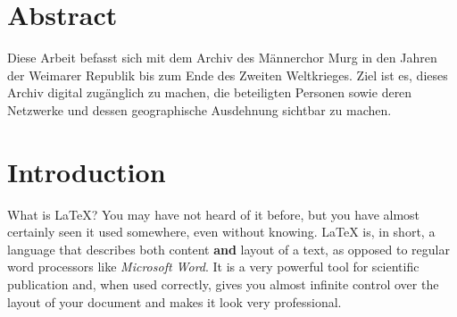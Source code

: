 \documentclass[12pt, a4paper, ngerman, bidi=default]{article}
\renewcommand*\contentsname{Inhaltsverzeichnis}
\newcommand\contentsname{Inhaltsverzeichnis}
\begin{document}
\pagecolor{white}  
\color{black}  %
\section*{Abstract}

Diese Arbeit befasst sich mit dem Archiv des Männerchor Murg in den Jahren der Weimarer Republik bis zum Ende des Zweiten Weltkrieges. Ziel ist es, dieses Archiv digital zugänglich zu machen, die beteiligten Personen sowie deren Netzwerke und dessen geographische Ausdehnung sichtbar zu machen.








\renewcommand*\contentsname{Table of Contents} %
{
\hypersetup{linkcolor=}
\setcounter{tocdepth}{5} %
\tableofcontents
}
\newpage
{} %



\section{Introduction}

What is LaTeX? You may have not heard of it before, but you have almost certainly seen it used somewhere, even without knowing. LaTeX is, in short, a language that describes both content \textbf{and} layout of a text, as opposed to regular word processors like \emph{Microsoft Word}. It is a very powerful tool for scientific publication and, when used correctly, gives you almost infinite control over the layout of your document and makes it look very professional.
\end{document}
